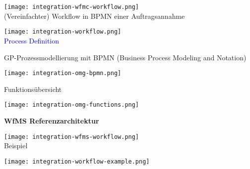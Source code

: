 \texttt{[image: integration-wfmc-workflow.png]} \\

\vfill\null
\columnbreak
(Vereinfachter) Workflow in BPMN einer Auftragsannahme

\texttt{[image: integration-workflow.png]} \\

\textcolor{blue}{Process Definition}

GP-Prozessmodellierung mit BPMN (Business Process Modeling and Notation)

\texttt{[image: integration-omg-bpmn.png]}

Funktionsübersicht

\texttt{[image: integration-omg-functions.png]} \\

\vfill\null
\columnbreak

\textbf{WfMS Referenzarchitektur}

\texttt{[image: integration-wfms-workflow.png]} \\

Beispiel

\texttt{[image: integration-workflow-example.png]} \\

